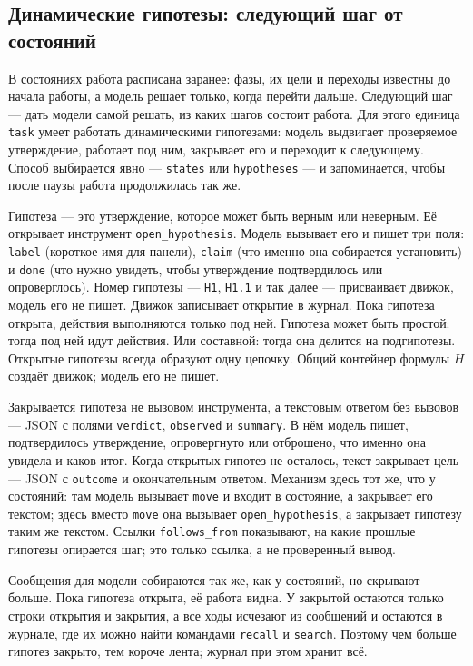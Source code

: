 \documentclass[11pt,a4paper]{article}
\begin{document}
\subsection{Динамические гипотезы: следующий шаг от состояний}
\label{sec:hypotheses}

В состояниях работа расписана заранее: фазы, их цели и переходы известны до начала работы, а
модель решает только, когда перейти дальше. Следующий шаг --- дать модели самой решать, из
каких шагов состоит работа. Для этого единица \texttt{task} умеет работать динамическими
гипотезами: модель выдвигает проверяемое утверждение, работает под ним, закрывает его и
переходит к следующему. Способ выбирается явно --- \texttt{states} или \texttt{hypotheses} ---
и запоминается, чтобы после паузы работа продолжилась так же.

Гипотеза --- это утверждение, которое может быть верным или неверным. Её открывает инструмент
\texttt{open\_hypothesis}. Модель вызывает его и пишет три поля: \texttt{label} (короткое имя
для панели), \texttt{claim} (что именно она собирается установить) и \texttt{done} (что нужно
увидеть, чтобы утверждение подтвердилось или опроверглось). Номер гипотезы --- \texttt{H1},
\texttt{H1.1} и так далее --- присваивает движок, модель его не пишет. Движок записывает
открытие в журнал. Пока гипотеза открыта, действия выполняются только под ней. Гипотеза может
быть простой: тогда под ней идут действия. Или составной: тогда она делится на подгипотезы.
Открытые гипотезы всегда образуют одну цепочку. Общий контейнер формулы $H$ создаёт движок;
модель его не пишет.

Закрывается гипотеза не вызовом инструмента, а текстовым ответом без вызовов --- JSON с
полями \texttt{verdict}, \texttt{observed} и \texttt{summary}. В нём модель пишет,
подтвердилось утверждение, опровергнуто или отброшено, что именно она увидела и каков итог.
Когда открытых гипотез не осталось, текст закрывает цель --- JSON с \texttt{outcome} и
окончательным ответом. Механизм здесь тот же, что у состояний: там модель вызывает
\texttt{move} и входит в состояние, а закрывает его текстом; здесь вместо \texttt{move} она
вызывает \texttt{open\_hypothesis}, а закрывает гипотезу таким же текстом. Ссылки
\texttt{follows\_from} показывают, на какие прошлые гипотезы опирается шаг; это только ссылка,
а не проверенный вывод.

Сообщения для модели собираются так же, как у состояний, но скрывают больше. Пока гипотеза
открыта, её работа видна. У закрытой остаются только строки открытия и закрытия, а все ходы
исчезают из сообщений и остаются в журнале, где их можно найти командами \texttt{recall} и
\texttt{search}. Поэтому чем больше гипотез закрыто, тем короче лента; журнал при этом хранит
всё.
\end{document}
